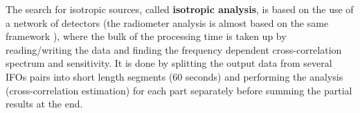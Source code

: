 

The search for isotropic sources, called {\bf isotropic analysis}, is based on the use of a network of detectors  \cite{ISOTROPIC1, ISOTROPIC2} (the radiometer analysis is almost based on the same framework \cite{RADIOMETER}), where the bulk of the processing time is taken up by reading/writing the data and finding the frequency dependent cross-correlation spectrum and sensitivity. It is done by splitting the output data from several IFOs pairs into short length segments (60 seconds) and performing the analysis (cross-correlation estimation)  for each part separately before summing the partial results at the end.  








